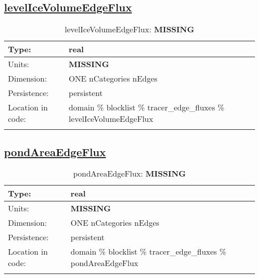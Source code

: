 \subsection[levelIceVolumeEdgeFlux]{\hyperref[sec:var_tab_tracer_edge_fluxes]{levelIceVolumeEdgeFlux}}
\label{subsec:var_sec_tracer_edge_fluxes_levelIceVolumeEdgeFlux}
\begin{center}
\begin{longtable}{| p{2.0in} | p{4.0in} |}
        \hline 
        Type: & real \\
        \hline 
        Units: & {\bf \color{red} MISSING} \\
        \hline 
        Dimension: & ONE nCategories nEdges \\
        \hline 
        Persistence: & persistent \\
        \hline 
         Location in code: & domain \% blocklist \% tracer\_edge\_fluxes \% levelIceVolumeEdgeFlux \\
         \hline 
    \caption{levelIceVolumeEdgeFlux: {\bf \color{red} MISSING}}
\end{longtable}
\end{center}
\subsection[pondAreaEdgeFlux]{\hyperref[sec:var_tab_tracer_edge_fluxes]{pondAreaEdgeFlux}}
\label{subsec:var_sec_tracer_edge_fluxes_pondAreaEdgeFlux}
\begin{center}
\begin{longtable}{| p{2.0in} | p{4.0in} |}
        \hline 
        Type: & real \\
        \hline 
        Units: & {\bf \color{red} MISSING} \\
        \hline 
        Dimension: & ONE nCategories nEdges \\
        \hline 
        Persistence: & persistent \\
        \hline 
         Location in code: & domain \% blocklist \% tracer\_edge\_fluxes \% pondAreaEdgeFlux \\
         \hline 
    \caption{pondAreaEdgeFlux: {\bf \color{red} MISSING}}
\end{longtable}
\end{center}
